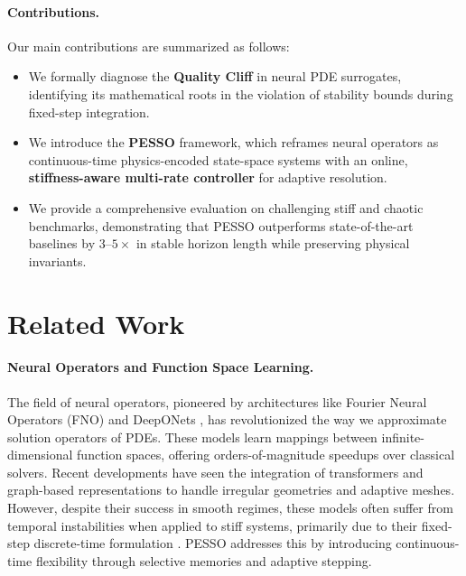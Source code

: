 \documentclass{article}
\theoremstyle{plain}
\theoremstyle{definition}
\theoremstyle{remark}
\begin{document}
\paragraph{Contributions.}
Our main contributions are summarized as follows:
\begin{itemize}
    \item We formally diagnose the \textbf{Quality Cliff} in neural PDE surrogates, identifying its mathematical roots in the violation of stability bounds during fixed-step integration.
    \item We introduce the \textbf{PESSO} framework, which reframes neural operators as continuous-time physics-encoded state-space systems with an online, \textbf{stiffness-aware multi-rate controller} for adaptive resolution.
    \item We provide a comprehensive evaluation on challenging stiff and chaotic benchmarks, demonstrating that PESSO outperforms state-of-the-art baselines by $3\text{--}5\times$ in stable horizon length while preserving physical invariants.
\end{itemize}

\section{Related Work}
\label{sec:related}

\paragraph{Neural Operators and Function Space Learning.}
The field of neural operators, pioneered by architectures like Fourier Neural Operators (FNO) \cite{li2020fno} and DeepONets \cite{lu2021deeponet}, has revolutionized the way we approximate solution operators of PDEs. These models learn mappings between infinite-dimensional function spaces, offering orders-of-magnitude speedups over classical solvers. Recent developments have seen the integration of transformers \cite{li2023pdeTransformer} and graph-based representations \cite{franco2023gnnSurrogate} to handle irregular geometries and adaptive meshes. However, despite their success in smooth regimes, these models often suffer from temporal instabilities when applied to stiff systems, primarily due to their fixed-step discrete-time formulation \cite{liu2025neuralOperatorSurvey, oh2025ndeReview}. PESSO addresses this by introducing continuous-time flexibility through selective memories and adaptive stepping.
\end{document}
